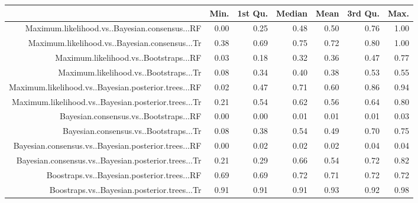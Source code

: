 \begin{table}[ht]
\centering
\begin{tabular}{rrrrrrr}
  \hline
 & Min. & 1st Qu. & Median & Mean & 3rd Qu. & Max. \\ 
  \hline
Maximum.likelihood.vs..Bayesian.consensus...RF & 0.00 & 0.25 & 0.48 & 0.50 & 0.76 & 1.00 \\ 
  Maximum.likelihood.vs..Bayesian.consensus...Tr & 0.38 & 0.69 & 0.75 & 0.72 & 0.80 & 1.00 \\ 
  Maximum.likelihood.vs..Bootstraps...RF & 0.03 & 0.18 & 0.32 & 0.36 & 0.47 & 0.77 \\ 
  Maximum.likelihood.vs..Bootstraps...Tr & 0.08 & 0.34 & 0.40 & 0.38 & 0.53 & 0.55 \\ 
  Maximum.likelihood.vs..Bayesian.posterior.trees...RF & 0.02 & 0.47 & 0.71 & 0.60 & 0.86 & 0.94 \\ 
  Maximum.likelihood.vs..Bayesian.posterior.trees...Tr & 0.21 & 0.54 & 0.62 & 0.56 & 0.64 & 0.80 \\ 
  Bayesian.consensus.vs..Bootstraps...RF & 0.00 & 0.00 & 0.01 & 0.01 & 0.01 & 0.03 \\ 
  Bayesian.consensus.vs..Bootstraps...Tr & 0.08 & 0.38 & 0.54 & 0.49 & 0.70 & 0.75 \\ 
  Bayesian.consensus.vs..Bayesian.posterior.trees...RF & 0.00 & 0.02 & 0.02 & 0.02 & 0.04 & 0.04 \\ 
  Bayesian.consensus.vs..Bayesian.posterior.trees...Tr & 0.21 & 0.29 & 0.66 & 0.54 & 0.72 & 0.82 \\ 
  Boostraps.vs..Bayesian.posterior.trees...RF & 0.69 & 0.69 & 0.72 & 0.71 & 0.72 & 0.72 \\ 
  Boostraps.vs..Bayesian.posterior.trees...Tr & 0.91 & 0.91 & 0.91 & 0.93 & 0.92 & 0.98 \\ 
   \hline
\end{tabular}
\end{table}


